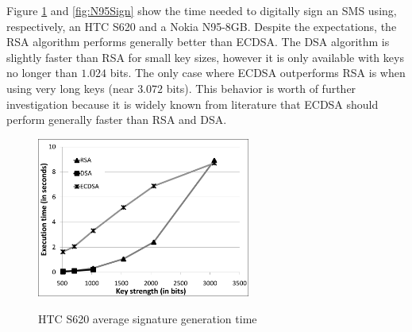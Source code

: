 \documentclass[authoryear]{elsarticle}
\begin{document}




Figure \ref{fig:HTCSign} and \ref{fig:N95Sign} show the time needed to digitally sign an SMS using, respectively, an HTC S620 and a Nokia N95-8GB. Despite the expectations, the RSA algorithm performs generally better than ECDSA. The DSA algorithm is slightly faster than RSA for small key sizes, however it is only available with keys no longer than $1.024$ bits. The only case where ECDSA outperforms RSA is when using very long keys (near $3.072$ bits). This behavior is worth of further investigation because it is widely known from literature that ECDSA should perform generally faster than RSA and DSA.

\begin{figure}[ht]
\begin{center}
  \includegraphics[width=7cm]{immagini/HTCSign.pdf}\\
  \caption{HTC S620 average signature generation time}
  \label{fig:HTCSign}
\end{center}
\end{figure}
\end{document}
